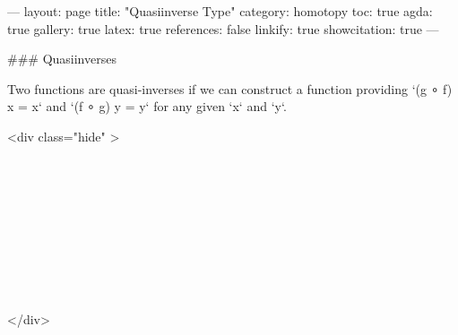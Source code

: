 ---
layout: page
title: "Quasiinverse Type"
category: homotopy
toc: true
agda: true
gallery: true
latex: true
references: false
linkify: true
showcitation: true
---

### Quasiinverses

Two functions are quasi-inverses if we can construct a function providing
`(g ∘ f) x = x` and `(f ∘ g) y = y` for any given `x` and `y`.

<div class="hide" >
\begin{code}%
\>[0]\AgdaSymbol{\{-\#}\AgdaSpace{}%
\AgdaSpace{}%
\AgdaSpace{}%
\AgdaSymbol{\#-\}}\<%
\\
\>[0]\AgdaSpace{}%
\AgdaSpace{}%
\<%
\\
\>[0]\AgdaSpace{}%
\AgdaSpace{}%
\<%
\\
%
\\[\AgdaEmptyExtraSkip]%
\>[0]\AgdaSpace{}%
\AgdaSpace{}%
\<%
\\
\>[0]\AgdaSpace{}%
\AgdaSpace{}%
\<%
\\
%
\\[\AgdaEmptyExtraSkip]%
%
\\[\AgdaEmptyExtraSkip]%
\>[0]\AgdaSpace{}%
\AgdaSpace{}%
\<%
\end{code}
</div>

\begin{code}%
\>[0]\AgdaSpace{}%
\AgdaSpace{}%
\AgdaSymbol{\{}\AgdaSpace{}%
\AgdaSymbol{:}\AgdaSpace{}%
\AgdaSpace{}%
\AgdaSymbol{\}}\AgdaSpace{}%
\AgdaSymbol{\{}\AgdaSpace{}%
\AgdaSymbol{:}\AgdaSpace{}%
\AgdaSpace{}%
\AgdaSymbol{\}}\AgdaSpace{}%
\<%
\end{code}

